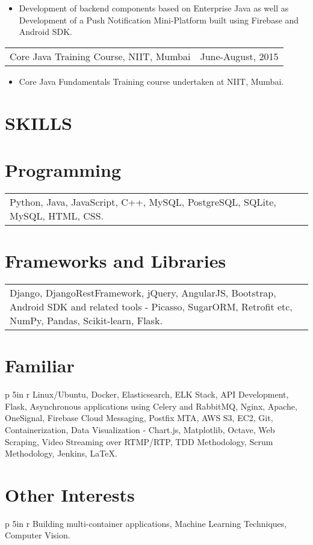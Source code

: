 \documentclass[margin]{res}
\begin{document}
\begin{resume}
\begin{itemize}
                   \item[] Development of backend components based on Enterprise Java as well as Development of a Push Notification Mini-Platform built using Firebase and Android SDK.
                  \end{itemize}
                 \begin{tabular}{p{3.5in} r} %
                  Core Java Training Course, NIIT, Mumbai & June-August, 2015
                 \end{tabular}
                  \begin{itemize}
                   \item[] Core Java Fundamentals Training course undertaken at NIIT, Mumbai.
                  \end{itemize}

\section{SKILLS} 
\normalsize{\section{Programming}}
                 \begin{tabular}{p{5in} r}
                 Python, Java, JavaScript, C++, MySQL, PostgreSQL, SQLite, MySQL, HTML, CSS.
                 \end{tabular}
\normalsize{\section{Frameworks and Libraries}} 
                 \begin{tabular}{p{5in} r}
                  Django, DjangoRestFramework, jQuery, AngularJS, Bootstrap, Android SDK and related tools - Picasso, SugarORM, Retrofit etc, NumPy, Pandas, Scikit-learn, Flask.
                  \end{tabular}
\normalsize{\section{Familiar}}
	           \begin{tabular}{p {5in} r}
                   Linux/Ubuntu, Docker, Elasticsearch, ELK Stack, API Development, Flask, Asynchronous applications using Celery and RabbitMQ, Nginx, Apache, OneSignal, Firebase Cloud Messaging, Postfix MTA, AWS S3, EC2, Git, Containerization, Data Visualization - Chart.js, Matplotlib, Octave, Web Scraping, Video Streaming over RTMP/RTP, TDD Methodology, Scrum Methodology, Jenkins, LaTeX.
                   \end{tabular}
\normalsize{\section{Other Interests}}
                  \begin{tabular}{p {5in} r}
                  Building multi-container applications, Machine Learning Techniques, Computer Vision.


\end{tabular}
\end{resume}
\end{document}
